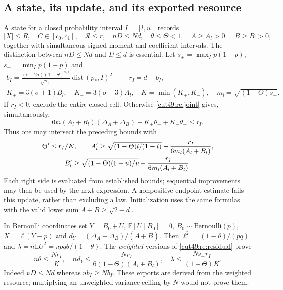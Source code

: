 \documentclass[11pt,a4paper]{article}
\numberwithin{equation}{section}
\theoremstyle{definition}
\theoremstyle{remark}
\newcommand{\E}{\mathbb E}
\begin{document}
\subsection{A state, its update, and its exported resource}
A state for a closed probability interval $I=[l,u]$ records
\[
 |X|\le R,\quad C\in[c_0,c_1],\quad\mathcal R\le r,
 \quad nD\le Nd,\quad\theta\le\Theta<1,
 \quad A\ge A_l>0,\quad B\ge B_l>0,
\]
together with simultaneous signed-moment and coefficient intervals.
The distinction between $nD\le Nd$ and $D\le d$ is essential.
Let $s_+=\max_Ip(1-p)$, $s_-=\min_Ip(1-p)$ and
\begin{gather*}
 b_I=\frac{(6+2\sigma)(1-\Theta)^{3/2}}{\sqrt{s_+}}
                 \operatorname{dist}(p_*,I)^2,
 \qquad r_I=d-b_I,\\
 K_+=3(\sigma+1)B_l,\quad K_-=3(\sigma+3)A_l,
 \quad K=\min(K_+,K_-),\quad m_l=\sqrt{(1-\Theta)s_-}.
\end{gather*}
If $r_I<0$, exclude the entire closed cell. Otherwise \eqref{cut49:re:joint}
gives, simultaneously,
\begin{equation}\label{cut49:re:residual}
 6m(A_l+B_l)(\Delta_A+\Delta_B)+K_+\theta_++K_-\theta_-\le r_I.
\end{equation}
Thus one may intersect the preceding bounds with
\begin{gather}
 \Theta'\le r_I/K,\qquad
 A_l'\ge\sqrt{(1-\Theta)l/(1-l)}-
                  \frac{r_I}{6m_l(A_l+B_l)},\notag\\
 B_l'\ge\sqrt{(1-\Theta)(1-u)/u}-
                  \frac{r_I}{6m_l(A_l+B_l)}.\label{cut49:re:geometry}
\end{gather}
Each right side is evaluated from established bounds; sequential
improvements may then be used by the next expression. A nonpositive
endpoint estimate fails this update, rather than excluding a law.
Initialization uses the same formulas with the valid lower sum
$A+B\ge\sqrt{2-d}$.

In Bernoulli coordinates set $Y=B_0+U$, $\E[U\mid B_0]=0$,
$B_0\sim\mathrm{Bernoulli}(p)$, $X=\ell(Y-p)$ and
$d_Y=(\Delta_A+\Delta_B)/(\bar A+\bar B)$.
Then $\ell^2=(1-\theta)/(pq)$ and $\lambda=n\E U^2=npq\theta/(1-\theta)$.
The \emph{weighted} versions of \eqref{cut49:re:residual} prove
\begin{equation}\label{cut49:re:exports}
 n\theta\le\frac{Nr_I}{K},\quad
 nd_Y\le\frac{Nr_I}{6(1-\Theta)(A_l+B_l)},\quad
 \lambda\le\frac{Ns_+r_I}{(1-\Theta)K}.
\end{equation}
Indeed $nD\le Nd$ whereas $nb_I\ge Nb_I$.
These exports are derived from the weighted resource; multiplying an
unweighted variance ceiling by $N$ would not prove them.
\end{document}
